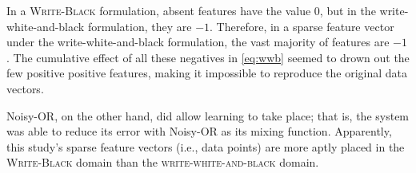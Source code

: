 In a \textsc{Write-Black} formulation, absent features have the value $0$, but in the write-white-and-black formulation, they are $-1$. Therefore, in a sparse feature vector under the write-white-and-black formulation, the vast majority of features are $-1$. The cumulative effect of all these negatives in \eqref{eq:wwb} seemed to drown out the few positive positive features, making it impossible to reproduce the original data vectors. 

Noisy-OR, on the other hand, did allow learning to take place; that is, 
the system was able to reduce its error with Noisy-OR as its mixing function. 
Apparently, this study's sparse feature vectors (i.e., data points) are more aptly 
placed in the \textsc{Write-Black} domain than the \textsc{write-white-and-black} domain.

